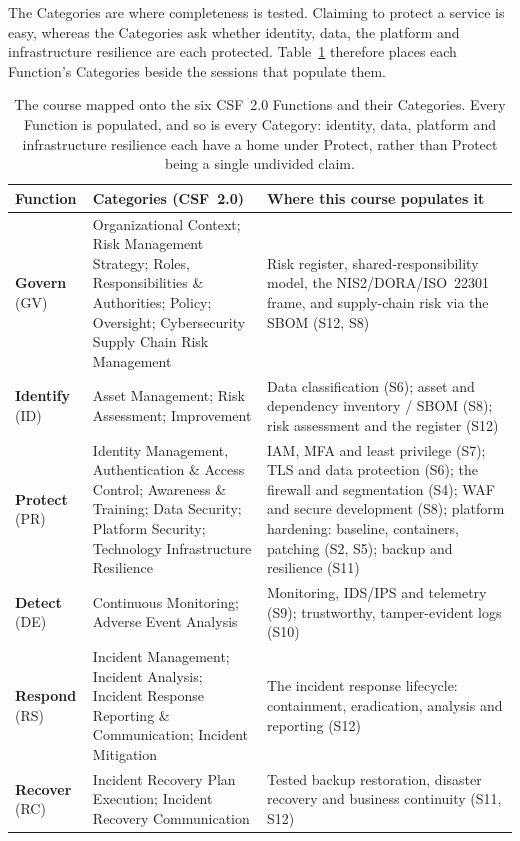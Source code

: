 The Categories are where completeness is tested. Claiming to protect a
service is easy, whereas the Categories ask whether identity, data, the
platform and infrastructure resilience are each protected.
Table~\ref{tab:csf} therefore places each Function's Categories beside the
sessions that populate them.

\begin{table}[htbp]
\centering
\small
\renewcommand{\arraystretch}{1.3}
\begin{tabular}{@{}p{2.1cm} p{6.2cm} p{5.4cm}@{}}
\toprule
\textbf{Function} & \textbf{Categories (CSF~2.0)} & \textbf{Where this course populates it} \\
\midrule
\textbf{Govern} (GV) &
Organizational Context; Risk Management Strategy; Roles, Responsibilities \&
Authorities; Policy; Oversight; Cybersecurity Supply Chain Risk Management &
Risk register, shared-responsibility model, the NIS2/DORA/ISO~22301 frame,
and supply-chain risk via the SBOM (S12, S8) \\

\textbf{Identify} (ID) &
Asset Management; Risk Assessment; Improvement &
Data classification (S6); asset and dependency inventory / SBOM (S8); risk
assessment and the register (S12) \\

\textbf{Protect} (PR) &
Identity Management, Authentication \& Access Control; Awareness \& Training; Data
Security; Platform Security; Technology Infrastructure Resilience &
IAM, MFA and least privilege (S7); TLS and data protection (S6); the firewall
and segmentation (S4); WAF and secure development (S8); platform hardening:
baseline, containers, patching (S2, S5); backup and resilience (S11) \\

\textbf{Detect} (DE) &
Continuous Monitoring; Adverse Event Analysis &
Monitoring, IDS/IPS and telemetry (S9); trustworthy, tamper-evident logs (S10) \\

\textbf{Respond} (RS) &
Incident Management; Incident Analysis; Incident Response Reporting \&
Communication; Incident Mitigation &
The incident response lifecycle: containment, eradication, analysis and
reporting (S12) \\

\textbf{Recover} (RC) &
Incident Recovery Plan Execution; Incident Recovery Communication &
Tested backup restoration, disaster recovery and business continuity (S11, S12) \\
\bottomrule
\end{tabular}
\caption{The course mapped onto the six CSF~2.0 Functions and their
Categories. Every Function is populated, and so is every Category: identity,
data, platform and infrastructure resilience each have a home under Protect,
rather than Protect being a single undivided claim.}
\label{tab:csf}
\end{table}

